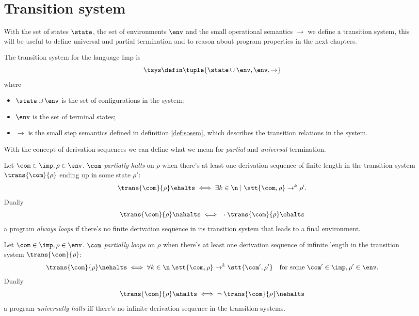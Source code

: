 \section{Transition system}

With the set of states \(\state\), the set of environments \(\env\)
and the small operational semantics \(\to\) we define a transition
system, this will be useful to define universal and partial
termination and to reason about program properties in the next
chapters.

\begin{definition} The transition system for the
  language Imp is
  \[\tsys \defin \tuple{\state \cup \env, \env, \to}\] where
  \begin{itemize}
  \item \(\state \cup \env\) is the set of configurations in the system;
  \item \(\env\) is the set of terminal states;
  \item \(\to\) is the small step semantics defined in definition
    \ref{def:sosem}, which describes the transition relations in the
    system.
  \end{itemize}
\end{definition}
\noindent
With the concept of derivation sequences we can define what we mean for
\emph{partial} and \emph{universal} termination.
\begin{definition}
  Let \(\com \in \imp, \rho \in \env\). \(\com\) \emph{partially
    halts} on \(\rho\) when there's at least one derivation sequence of finite length
  in the transition system \(\trans{\com}{\rho}\) ending up in some
  state \(\rho'\):
  \[ \trans{\com}{\rho} \ehalts \iff \exists k \in \n \mid \stt{\com,
      \rho} \to^k \rho'.\] Dually
  \[ \trans{\com}{\rho} \nahalts \iff \neg \; \trans{\com}{\rho}
    \ehalts \] a program \emph{always loops} if there's no finite derivation sequence
  in its transition system that leads to a final environment.
\end{definition}
\begin{definition}
  Let \(\com \in \imp, \rho \in \env\). \(\com\) \emph{partially
    loops} on \(\rho\) when there's at least one derivation sequence of infinite
  length in the transition system \(\trans{\com}{\rho}\):
  \[ \trans{\com}{\rho} \nehalts \iff \forall k \in \n \; \stt{\com,
      \rho} \to^k \stt{\com', \rho'} \quad \text{for some }
    \com'\in\imp, \rho'\in\env.\] Dually
  \begin{equation*}
    \trans{\com}{\rho} \ahalts \iff \neg \; \trans{\com}{\rho}
    \nehalts
  \end{equation*}
  a program \emph{universally halts} iff there's no infinite derivation sequence in
  the transition systems.
\end{definition}

